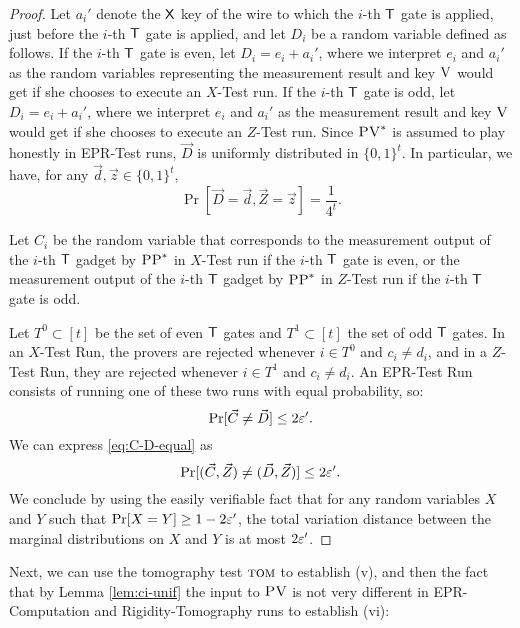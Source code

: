\begin{proof}
Let $a_i'$ denote the $\sf X$ key of the wire to which the $i$-th $\sf T$ gate is applied, just before the $i$-th $\sf T$ gate is applied, and let $D_i$ be a random variable defined as follows. If the $i$-th $\sf T$ gate is even, let $D_i=e_i+a_i'$, where we interpret $e_i$ and $a_i'$ as the random variables representing the measurement result and key $\textsc{V}$ would get if she chooses to execute an $X$-Test run. If the $i$-th $\sf T$ gate is odd, let $D_i=e_i+a_i'$, where we interpret $e_i$ and $a_i'$ as the measurement result and key $\textsc{V}$ would get if she chooses to execute an $Z$-Test run. Since $\textsc{PV}^*$ is assumed to play honestly in EPR-Test runs, $\vec{D}$ is uniformly distributed in $\{0,1\}^t$. In particular, we have, for any $\vec{d},\vec{z}\in\{0,1\}^t$,
\begin{equation}
\Pr[\vec{D}=\vec{d},\vec{Z}=\vec{z}]=\frac{1}{4^t}.\label{eq:D-unif}
\end{equation}

Let $C_i$ be the random variable that corresponds to the measurement output of
  the $i$-th $\sf T$ gadget by $\textsc{PP}^*$ in $X$-Test run if the $i$-th $\sf T$
  gate is even, or the measurement output of the $i$-th $\sf T$ gadget 
  by $\textsc{PP}^*$ in $Z$-Test run if the $i$-th $\sf T$ gate is odd.

Let $T^0\subset[t]$ be the set of even $\sf T$ gates and $T^1\subset[t]$ the set of odd $\sf T$ gates. In an $X$-Test Run, the provers are rejected whenever $i\in T^0$ and $c_i\neq d_i$, and in a $Z$-Test Run, they are rejected whenever $i\in T^1$ and $c_i\neq d_i$. An EPR-Test Run consists of running one of these two runs with equal probability, so:
\begin{equation}
\Pr[\vec{C}\neq\vec{D}]  \leq  2\varepsilon'.\label{eq:C-D-equal}
\end{equation}
We can express \eqref{eq:C-D-equal} as
\begin{equation*}
\Pr[(\vec{C},\vec{Z})\neq(\vec{D},\vec{Z})]  \leq  2\varepsilon'.
\end{equation*}
We conclude by using the easily verifiable fact that for any random variables $X$ and $Y$ such that $\Pr[X= Y]\geq 1-2\varepsilon'$, the total variation distance between the marginal distributions on $X$ and $Y$ is at most $2\varepsilon'$. 
\end{proof}

Next, we can use the tomography test $\textsc{tom}$ to establish (v), and then the fact that by Lemma \ref{lem:ci-unif} the input to $\textsc{PV}$ is not very different in EPR-Computation and Rigidity-Tomography runs to establish (vi):

